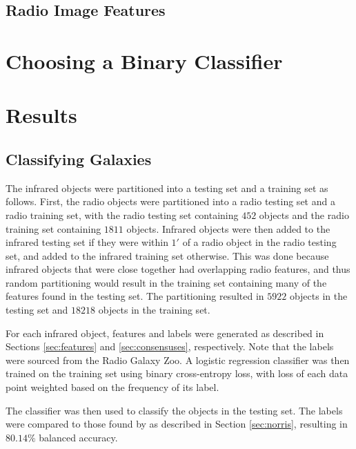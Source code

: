   \subsection{Radio Image Features}

\section{Choosing a Binary Classifier}
\label{sec:binary-classifier}

\section{Results}
\label{sec:passive-results}
  
  \subsection{Classifying Galaxies}


    The infrared objects were partitioned into a testing set and a training set as follows. First, the radio objects were partitioned into a radio testing set and a radio training set, with the radio testing set containing $452$ objects and the radio training set containing $1811$ objects. Infrared objects were then added to the infrared testing set if they were within $1'$ of a radio object in the radio testing set, and added to the infrared training set otherwise. This was done because infrared objects that were close together had overlapping radio features, and thus random partitioning would result in the training set containing many of the features found in the testing set. The partitioning resulted in $5922$ objects in the testing set and $18218$ objects in the training set.

    For each infrared object, features and labels were generated as described in Sections \ref{sec:features} and \ref{sec:consensuses}, respectively. Note that the labels were sourced from the Radio Galaxy Zoo. A logistic regression classifier was then trained on the training set using binary cross-entropy loss, with loss of each data point weighted based on the frequency of its label.

    The classifier was then used to classify the objects in the testing set. The labels were compared to those found by \citet{norris06} as described in Section \ref{sec:norris}, resulting in $80.14\%$ balanced accuracy.

